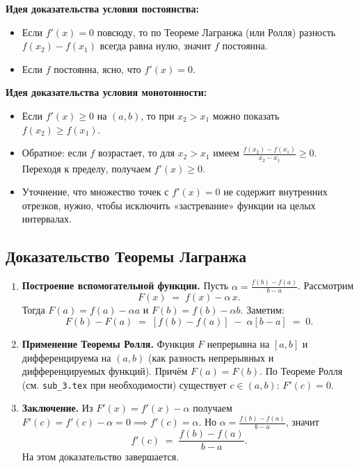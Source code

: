 \textbf{Идея доказательства условия постоянства:}
\begin{itemize}
  \item Если $f'(x)=0$ повсюду, то по Теореме Лагранжа (или Ролля) разность $f(x_2)-f(x_1)$ всегда равна нулю, значит $f$ постоянна.
  \item Если $f$ постоянна, ясно, что $f'(x)=0$.  
\end{itemize}

\textbf{Идея доказательства условия монотонности:}
\begin{itemize}
  \item Если $f'(x)\ge0$ на $(a,b)$, то при $x_2>x_1$ можно показать $f(x_2)\ge f(x_1)$.  
  \item Обратное: если $f$ возрастает, то для $x_2>x_1$ имеем $\frac{f(x_2)-f(x_1)}{x_2-x_1}\ge0$. Переходя к пределу, получаем $f'(x)\ge 0$.  
  \item Уточнение, что множество точек с $f'(x)=0$ не содержит внутренних отрезков, нужно, чтобы исключить «застревание» функции на целых интервалах.  
\end{itemize}

\medskip


\subsection*{Доказательство Теоремы Лагранжа}

\begin{enumerate}
  \item \textbf{Построение вспомогательной функции.}  
  Пусть $\alpha=\frac{f(b)-f(a)}{b-a}$. Рассмотрим
  \[
    F(x) \;=\; f(x) - \alpha\,x.
  \]
  Тогда $F(a)=f(a)-\alpha a$ и $F(b)=f(b)-\alpha b$. Заметим:
  \[
    F(b)-F(a) \;=\; [f(b)-f(a)] \;-\;\alpha[b - a] \;=\; 0.
  \]
  \item \textbf{Применение Теоремы Ролля.}  
  Функция $F$ непрерывна на $[a,b]$ и дифференцируема на $(a,b)$ (как разность непрерывных и дифференцируемых функций). Причём $F(a)=F(b)$.  
  По Теореме Ролля (см. \texttt{sub\_3.tex} при необходимости) существует $c \in(a,b)$: $F'(c)=0$.  
  \item \textbf{Заключение.}  
  Из $F'(x)=f'(x) - \alpha$ получаем $F'(c)=f'(c)-\alpha=0 \implies f'(c)=\alpha$. Но $\alpha= \tfrac{f(b)-f(a)}{b-a}$, значит
  \[
    f'(c) \;=\; \frac{f(b)-f(a)}{b-a}.
  \]
  На этом доказательство завершается.
\end{enumerate}

